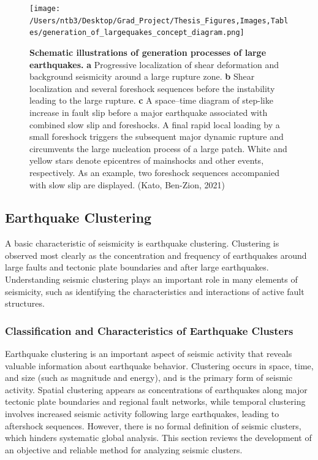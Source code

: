 \documentclass[12pt]{article} %
\theoremstyle{plain}
\begin{document}
	\begin{figure}
		\texttt{[image: /Users/ntb3/Desktop/Grad\_Project/Thesis\_Figures,Images,Tables/generation\_of\_largequakes\_concept\_diagram.png]}
		\caption{\textbf{Schematic illustrations of generation processes of large earthquakes.} \textbf{a} Progressive localization of shear deformation and background seismicity around a large rupture zone. \textbf{b} Shear localization and several foreshock sequences before the instability leading to the large rupture. \textbf{c} A space–time diagram of step-like increase in fault slip before a major earthquake associated with combined slow slip and foreshocks. A final rapid local loading by a small foreshock triggers the subsequent major dynamic rupture and circumvents the large nucleation process of a large patch. White and yellow stars denote epicentres of mainshocks and other events, respectively. As an example, two foreshock sequences accompanied with slow slip are displayed. (Kato, Ben-Zion, 2021)}
		\label{fig:generation_concept}
	\end{figure}
	
	
	
	
	\subsection{Earthquake Clustering}
	A basic characteristic of seismicity is earthquake clustering. Clustering is observed most clearly as the concentration and frequency of earthquakes around large faults and tectonic plate boundaries and after large earthquakes. Understanding seismic clustering plays an important role in many elements of seismicity, such as identifying the characteristics and interactions of active fault structures. 
	
	
	\subsubsection{Classification and Characteristics of Earthquake Clusters}
	
	Earthquake clustering is an important aspect of seismic activity that reveals valuable information about earthquake behavior. Clustering occurs in space, time, and size (such as magnitude and energy), and is the primary form of seismic activity. Spatial clustering appears as concentrations of earthquakes along major tectonic plate boundaries and regional fault networks, while temporal clustering involves increased seismic activity following large earthquakes, leading to aftershock sequences. However, there is no formal definition of seismic clusters, which hinders systematic global analysis. This section reviews the development of an objective and reliable method for analyzing seismic clusters.
	
\end{document}
